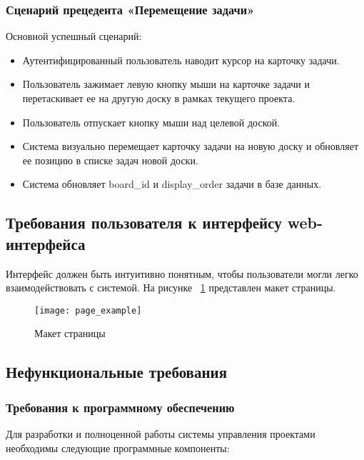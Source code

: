 \subsubsection{Сценарий прецедента «Перемещение задачи»}
Основной успешный сценарий:
\begin{itemize}
	\item Аутентифицированный пользователь наводит курсор на карточку задачи.
	\item Пользователь зажимает левую кнопку мыши на карточке задачи и перетаскивает ее на другую доску в рамках текущего проекта.
	\item Пользователь отпускает кнопку мыши над целевой доской.
	\item Система визуально перемещает карточку задачи на новую доску и обновляет ее позицию в списке задач новой доски.
	\item Система обновляет board\_id и display\_order задачи в базе данных.
\end{itemize}

\subsection{Требования пользователя к интерфейсу web-интерфейса}
Интерфейс должен быть интуитивно понятным, чтобы пользователи могли легко взаимодействовать с системой.
На рисунке ~\ref{page_example:image} представлен макет страницы.

\begin{figure}[H]
	\centering
	\texttt{[image: page\_example]}
	\caption{Макет страницы}
	\label{page_example:image}
\end{figure}

\subsection{Нефункциональные требования}

\subsubsection{Требования к программному обеспечению}

Для разработки и полноценной работы системы управления проектами необходимы следующие программные компоненты:

